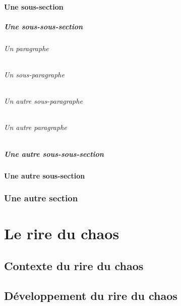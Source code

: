 \documentclass[12pt,version=final,space=onehalf,localtocs,localbibs]{yathesis}
\begin{document}
\subsection{Une sous-section}
\lipsum[29-31]
\subsubsection{Une sous-sous-section}
\lipsum[31-35]
\paragraph{Un paragraphe}
\lipsum[36-38]
\paragraph{Un sous-paragraphe}
\lipsum[39-41]
\paragraph{Un autre sous-paragraphe}
\lipsum[39-41]
\paragraph{Un autre paragraphe}
\lipsum[36-38]
\subsubsection{Une autre sous-sous-section}
\lipsum[31-35]
\subsection{Une autre sous-section}
\lipsum[29-31]
\section{Une autre section}
\lipsum[28-29]
%
%
\part{Le rire du chaos}
%
\chapter{Contexte du rire du chaos}

\lipsum[26-32]
%
\chapter{Développement du rire du chaos}
\end{document}
